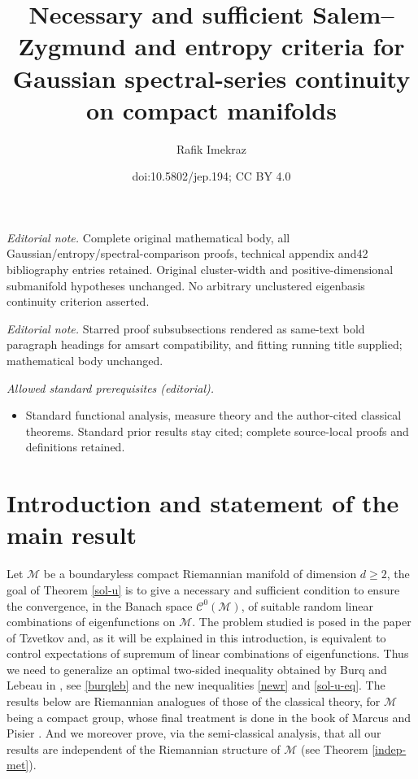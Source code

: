\documentclass[10pt]{amsart}
\title{Necessary and sufficient Salem–Zygmund and entropy criteria for Gaussian spectral-series continuity on compact manifolds}
\author{Rafik Imekraz}
\date{doi:10.5802/jep.194; CC BY 4.0}
\theoremstyle{theorem}
\theoremstyle{definition}
\newcommand\CC{\mathcal{C}}
\begin{document}
\maketitle
\noindent\textit{Editorial note.} Complete original mathematical body, all Gaussian/entropy/spectral-comparison proofs, technical appendix and42 bibliography entries retained. Original cluster-width and positive-dimensional submanifold hypotheses unchanged. No arbitrary unclustered eigenbasis continuity criterion asserted.\par\medskip
\noindent\textit{Editorial note.} Starred proof subsubsections rendered as same-text bold paragraph headings for amsart compatibility, and fitting running title supplied; mathematical body unchanged.\par\medskip
\noindent\textit{Allowed standard prerequisites (editorial).}\begin{itemize}
\item Standard functional analysis, measure theory and the author-cited classical theorems. Standard prior results stay cited; complete source-local proofs and definitions retained.
\end{itemize}\medskip
\vspace*{-\baselineskip}
\tableofcontents


\vspace*{-3\baselineskip}\mbox{}
\section{Introduction and statement of the main result}
Let $\mathcal{M}$ be a boundaryless compact Riemannian manifold of dimension $d\geq 2$, the goal of Theorem \ref{sol-u} is to give a necessary and sufficient condition to ensure the convergence, in the Banach space $\CC^0(\mathcal{M})$, of suitable random linear combinations of eigenfunctions on $\mathcal{M}$. The problem studied is posed in the paper of Tzvetkov \cite[p.\,XV]{Tzvetkov4} and, as it will be explained in this introduction, is equivalent to control expectations of supremum of linear combinations of eigenfunctions. Thus we need to generalize an optimal two-sided inequality obtained by Burq and Lebeau in \cite{burq-lebeau,burq-lebeau2}, see \eqref{burqleb} and the new inequalities \eqref{newr} and \eqref{sol-u-eq}.
The results below are Riemannian analogues of those of the classical theory, for $\mathcal{M}$ being a compact group, whose final treatment is done in the book of Marcus and Pisier \cite{pisier1981}. And we moreover prove, via the semi-classical analysis, that all our results are independent of the Riemannian structure of $\mathcal{M}$ (see Theorem \ref{indep-met}).%
\end{document}
